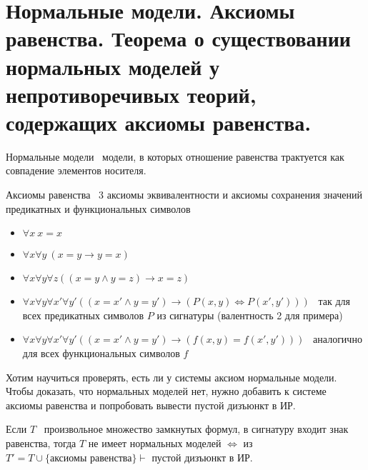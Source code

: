 \documentclass{article}
\begin{document}
\section{Нормальные модели. Аксиомы равенства. Теорема о существовании нормальных моделей у непротиворечивых теорий, содержащих аксиомы равенства.}

\begin{definition}
	Нормальные модели \textemdash\ модели, в которых отношение равенства трактуется как совпадение элементов носителя.
\end{definition}

\begin{definition}
	Аксиомы равенства \textemdash\ 3 аксиомы эквивалентности и аксиомы сохранения значений предикатных и функциональных символов
\end{definition}
\begin{itemize}
	\item $\forall x\ x = x$
	\item $\forall x \forall y\ (x = y \rightarrow y = x)$
	\item $\forall x \forall y \forall z ((x = y \wedge y = z) \rightarrow x = z)$
	\item $\forall x \forall y \forall x' \forall y' ((x = x' \wedge y = y') \rightarrow (P(x, y) \iff P(x', y')))$ \textemdash\ так для всех предикатных символов $P$ из сигнатуры (валентность 2 для примера)
	\item $\forall x \forall y \forall x' \forall y' ((x = x' \wedge y = y') \rightarrow (f(x, y) = f(x', y')))$ \textemdash\ аналогично для всех функциональных символов $f$
\end{itemize}

Хотим научиться проверять, есть ли у системы аксиом нормальные модели. Чтобы доказать, что нормальных моделей нет, нужно добавить к системе аксиомы равенства и попробовать вывести пустой дизъюнкт в ИР.

\begin{theorem}
	Если $T$ \textemdash\ произвольное множество замкнутых формул, в сигнатуру входит знак равенства, тогда $T$ не имеет нормальных моделей $\iff$ из $T' = T \cup \{\text{аксиомы равенства}\} \vdash $ пустой дизъюнкт в ИР.
\end{theorem}
\end{document}
